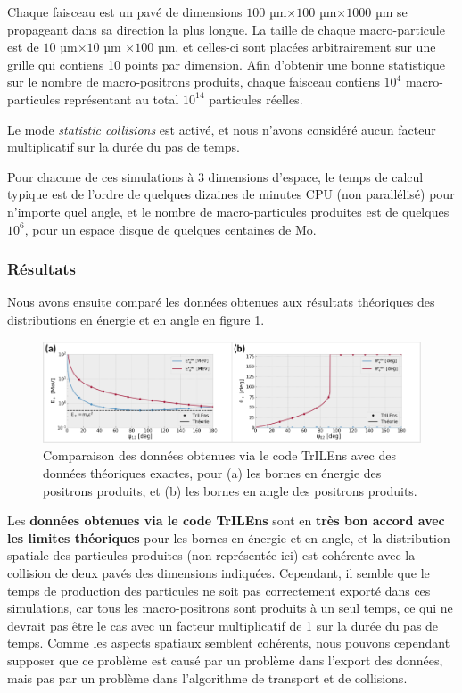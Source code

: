 \begin{refsection}
Chaque faisceau est un pavé de dimensions $100$ µm$\times 100$ µm$\times 1000$ µm se propageant dans sa direction la plus longue. La taille de chaque macro-particule est de $10$ µm$\times 10$ µm $\times 100$ µm, et celles-ci sont placées arbitrairement sur une grille qui contiens 10 points par dimension. Afin d'obtenir une bonne statistique sur le nombre de macro-positrons produits, chaque faisceau contiens $10^4$ macro-particules représentant au total $10^{14}$ particules réelles.

Le mode \textit{statistic collisions} est activé, et nous n'avons considéré aucun facteur multiplicatif sur la durée du pas de temps.

Pour chacune de ces simulations à 3 dimensions d'espace, le temps de calcul typique est de l'ordre de quelques dizaines de minutes CPU (non parallélisé) pour n'importe quel angle, et le nombre de macro-particules produites est de quelques $10^6$, pour un espace disque de quelques centaines de Mo. 

\subsubsection{Résultats}

Nous avons ensuite comparé les données obtenues aux résultats théoriques des distributions en énergie et en angle en figure \ref{fig:4-trilens_validation_E_theta}.

\begin{figure}[hbtp]
	\centering
	\includegraphics[width=\linewidth]{4-simulation/TrILEns_validation_Ep_thetap.png}
	\caption{Comparaison des données obtenues via le code TrILEns avec des données théoriques exactes, pour (a) les bornes en énergie des positrons produits, et (b) les bornes en angle des positrons produits.}
	\label{fig:4-trilens_validation_E_theta}
\end{figure}

Les \textbf{données obtenues via le code TrILEns} sont en \textbf{très bon accord avec les limites théoriques} pour les bornes en énergie et en angle, et la distribution spatiale des particules produites (non représentée ici) est cohérente avec la collision de deux pavés des dimensions indiquées. Cependant, il semble que le temps de production des particules ne soit pas correctement exporté dans ces simulations, car tous les macro-positrons sont produits à un seul temps, ce qui ne devrait pas être le cas avec un facteur multiplicatif de 1 sur la durée du pas de temps. Comme les aspects spatiaux semblent cohérents, nous pouvons cependant supposer que ce problème est causé par un problème dans l'export des données, mais pas par un problème dans l'algorithme de transport et de collisions.


\end{refsection}
